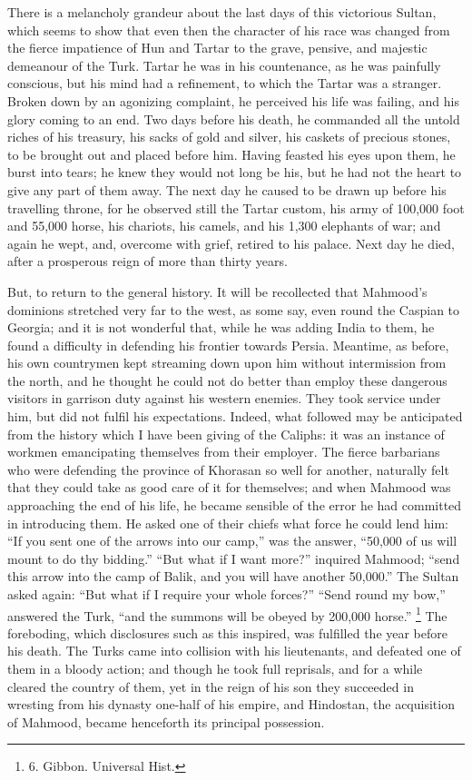 There is a melancholy grandeur
about the last days of this victorious Sultan, which seems to show
that even then the character of his race was changed from the fierce
impatience of Hun and Tartar to the grave, pensive, and majestic
demeanour of the Turk. Tartar he was in his countenance, as he was
painfully conscious, but his mind had a refinement, to which the
Tartar was a stranger. Broken down by an agonizing complaint, he
perceived his life was failing, and his glory coming to an end. Two
days before his death, he commanded all the untold riches of his
treasury, his sacks of gold and silver, his caskets of precious
stones, to be brought out and placed before him. Having feasted his
eyes upon them, he burst into tears; he knew they would not long be
his, but he had not the heart to give any part of them away. The next
day he caused to be drawn up before his travelling throne, for he
observed still the Tartar custom, his army of 100,000 foot and 55,000
horse, his chariots, his camels, and his 1,300 elephants of war; and
again he wept, and, overcome with grief, retired to his palace.
Next day he died, after a prosperous reign of more than thirty years.

But, to return to the general
history. It will be recollected that Mahmood's dominions stretched
very far to the west, as some say, even round the Caspian to Georgia;
and it is not wonderful that, while he was adding India to them, he
found a difficulty in defending his frontier towards Persia. Meantime,
as before, his own countrymen kept streaming down upon him without
intermission from the north, and he thought he could not do better
than employ these dangerous visitors in garrison duty against his
western enemies. They took service under him, but did not fulfil his
expectations. Indeed, what followed may be anticipated from the
history which I have been giving of the Caliphs: it was an instance of
workmen emancipating themselves from their employer. The fierce
barbarians who were defending the province of Khorasan so well for
another, naturally felt that they could take as good care of it for
themselves; and when Mahmood was approaching the end of his life, he
became sensible of the error he had committed in introducing them. He
asked one of their chiefs what force he could lend him: ``If you sent
one of the arrows into our camp,'' was the answer, ``50,000 of us will
mount to do thy bidding.'' ``But what if I want more?'' inquired Mahmood;
``send this arrow into the camp of Balik, and you will have another
50,000.'' The Sultan asked again: ``But what if I require your whole
forces?'' ``Send round my bow,'' answered the Turk, ``and the summons will
be obeyed by 200,000 horse.'' \footnote{6.
Gibbon. Universal Hist.}
The foreboding, which disclosures such as this inspired, was fulfilled
the year before his death. The Turks came into collision with his
lieutenants, and defeated one of them in a bloody action; and
though he took full reprisals, and for a while cleared the country of
them, yet in the reign of his son they succeeded in wresting from his
dynasty one-half of his empire, and Hindostan, the acquisition of
Mahmood, became henceforth its principal possession.

